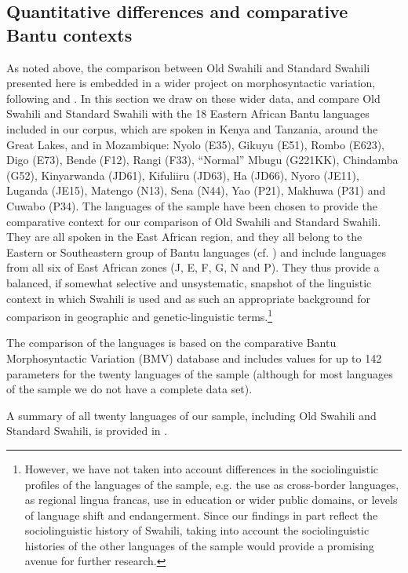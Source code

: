 \documentclass[output=paper]{langscibook}
\begin{document}
\subsection{Quantitative differences and comparative Bantu contexts}\label{sec:marten:4.2}

As noted above, the comparison between Old Swahili and Standard Swahili presented here is embedded in a wider project on morphosyntactic variation, following \citet{GuéroisEtAl2017} and \citet{MartenEtAl2018}. In this section we draw on these wider data, and compare Old Swahili and Standard Swahili with the 18 Eastern African Bantu languages included in our corpus, which are spoken in Kenya and Tanzania, around the Great Lakes, and in Mozambique: Nyolo (E35), Gikuyu (E51), Rombo (E623), Digo (E73), Bende (F12), Rangi (F33), ``Normal'' Mbugu (G221KK), Chindamba (G52), Kinyarwanda (JD61), Kifuliiru (JD63), Ha (JD66), Nyoro (JE11), Luganda (JE15), Matengo (N13), Sena (N44), Yao (P21), Makhuwa (P31) and Cuwabo (P34). The languages of the sample have been chosen to provide the comparative context for our comparison of Old Swahili and Standard Swahili. They are all spoken in the East African region, and they all belong to the Eastern or Southeastern group of Bantu languages (cf. \citealt{GrollemundEtAl2015}) and include languages from all six of  East African zones (J, E, F, G, N and P). They thus provide a balanced, if somewhat selective and unsystematic, snapshot of the linguistic context in which Swahili is used and as such an appropriate background for comparison in geographic and genetic-linguistic terms.\footnote{However, we have not taken into account differences in the sociolinguistic profiles of the languages of the sample, e.g. the use as cross-border languages, as regional lingua francas, use in education or wider public domains, or levels of language shift and endangerment. Since our findings in part reflect the sociolinguistic history of Swahili, taking into account the sociolinguistic histories of the other languages of the sample would provide a promising avenue for further research.}

  The comparison of the languages is based on the comparative Bantu Morphosyntactic Variation (BMV) database \citep{MartenEtAl2018} and includes values for up to 142 parameters for the twenty languages of the sample (although for most languages of the sample we do not have a complete data set).  

A summary of all twenty languages of our sample, including Old Swahili and Standard Swahili, is provided in .  
\end{document}
